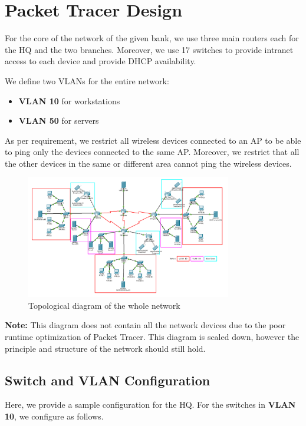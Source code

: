 \section{Packet Tracer Design}
For the core of the network of the given bank, we use three main routers each for the HQ and the two branches.
Moreover, we use 17 switches to provide intranet access to each device and provide DHCP availability.

We define two VLANs for the entire network:
\begin{itemize}
  \item \textbf{VLAN 10} for workstations
  \item \textbf{VLAN 50} for servers
\end{itemize}

As per requirement, we restrict all wireless devices connected to an AP to be able to ping only the devices connected to the same AP\@.
Moreover, we restrict that all the other devices in the same or different area cannot ping the wireless devices.

\begin{figure}[H]
  \centering
  \includegraphics[width=0.8\textwidth]{./assets/pkt1.png}
  \caption{Topological diagram of the whole network}
\end{figure}

\textbf{Note:} This diagram does not contain all the network devices due to the poor runtime optimization of Packet Tracer.
This diagram is scaled down, however the principle and structure of the network should still hold.

\subsection{Switch and VLAN Configuration}
Here, we provide a sample configuration for the HQ.
For the switches in \textbf{VLAN 10}, we configure as follows.

